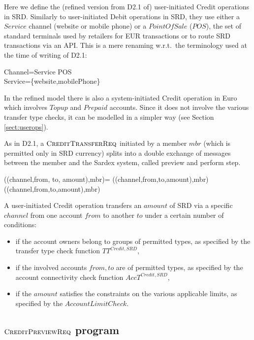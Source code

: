 Here we define the (refined version from D2.1 of) user-initiated Credit operations in SRD. Similarly to user-initiated Debit operations in SRD, they use either a $Service$ channel (website or mobile phone) or a $PointOfSale$ ($POS$), the set of standard terminals used by retailers for EUR transactions or to route SRD transactions via an API. This is a mere renaming w.r.t.\ the terminology used at the time of writing of D2.1:
\begin{asm}
Channel=Service \cup POS \\
Service=\{website,mobilePhone\}
\end{asm}

In the refined model there is also a system-initiated Credit operation in Euro which involves $Topup$ and $Prepaid$ accounts. Since it does not involve the various transfer type checks, it can be modelled in a simpler way (see Section \ref{sect:userops}).

As in D2.1, a $\hbox{\sc CreditTransferReq}$ initiated by a member $mbr$ (which is permitted only in SRD currency) splits into a double exchange of messages between the member and the Sardex system, called preview and perform step.

\begin{asm}
((channel,from, to, amount),mbr)=\+
   ((channel,from,to,amount),mbr)  \\
   ((channel,from,to,amount),mbr) 
\end{asm}


A user-initiated Credit operation transfers an $amount$ of SRD via a specific $channel$ from one account $from$ to another $to$ under a certain number of conditions:

\begin{itemize}
	\item if the account owners belong to groups of permitted types, as specified by the transfer type check function $TT^{Credit,SRD}$, 
	\item if the involved accounts $from,to$ are of permitted types, as specified by  the account connectivity check function $AccT^{Credit,SRD}$, 
	\item if the $amount$ satisfies the constraints on the various applicable limits, as specified by the $AccountLimitCheck$.
\end{itemize}


\subsection{$\hbox{\sc CreditPreviewReq}$ program}
\label{sect:creditpreview}

